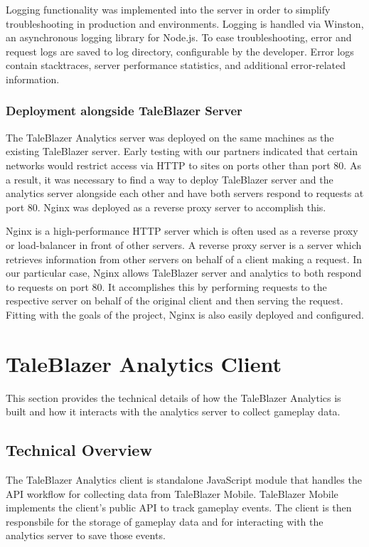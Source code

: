 Logging functionality was implemented into the server in order to simplify troubleshooting in production and environments. Logging is handled via Winston, an asynchronous logging library for Node.js. To ease troubleshooting, error and request logs are saved to log directory, configurable by the developer. Error logs contain stacktraces, server performance statistics, and additional error-related information.

\subsubsection{Deployment alongside TaleBlazer Server}

The TaleBlazer Analytics server was deployed on the same machines as the existing TaleBlazer server. Early testing with our partners indicated that certain networks would restrict access via HTTP to sites on ports other than port 80. As a result, it was necessary to find a way to deploy TaleBlazer server and the analytics server alongside each other and have both servers respond to requests at port 80. Nginx was deployed as a reverse proxy server to accomplish this. 

Nginx is a high-performance HTTP server which is often used as a reverse proxy or load-balancer in front of other servers. A reverse proxy server is a server which retrieves information from other servers on behalf of a client making a request. In our particular case, Nginx allows TaleBlazer server and analytics to both respond to requests on port 80. It accomplishes this by performing requests to the respective server on behalf of the original client and then serving the request. Fitting with the goals of the project, Nginx is also easily deployed and configured.

\section{TaleBlazer Analytics Client}

This section provides the technical details of how the TaleBlazer Analytics is built and how it interacts with the analytics server to collect gameplay data. 

\subsection{Technical Overview}

The TaleBlazer Analytics client is standalone JavaScript module that handles the API workflow for collecting data from TaleBlazer Mobile. TaleBlazer Mobile implements the client's public API to track gameplay events. The client is then responsbile for the storage of gameplay data and for interacting with the analytics server to save those events. 


